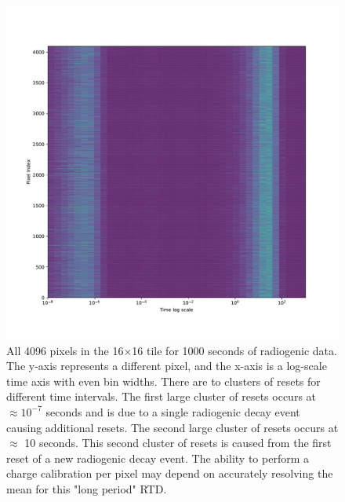 \begin{figure}[]
\centering
\includegraphics[width=\textwidth]{images/radiogenicRTDtimescale.pdf}
\caption{All 4096 pixels in the 16$\times$16 tile for 1000 seconds of radiogenic data. 
The y-axis represents a different pixel, and the x-axis is a log-scale time axis with even bin widths.
There are to clusters of resets for different time intervals.
The first large cluster of resets occurs at $\approx 10^{-7}$ seconds and is due to a single radiogenic decay event causing additional resets.
The second large cluster of resets occurs at $\approx$ 10 seconds.
This second cluster of resets is caused from the first reset of a new radiogenic decay event.
The ability to perform a charge calibration per pixel may depend on accurately resolving the mean for this "long period" RTD.
 }
\end{figure}~\label{fig:radiogenic_rtd_timescales}

